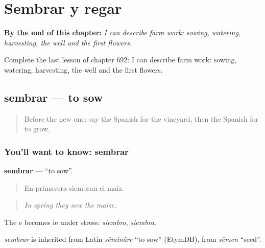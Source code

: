 
\chapter{Sembrar y regar}
\label{ch:es-sembrar-y-regar}

\begin{chapteropening}
\textbf{By the end of this chapter:} \emph{I can describe farm work: sowing, watering, harvesting, the well and the first flowers.}

Complete the last lesson of chapter 692: I can describe farm work: sowing, watering, harvesting, the well and the first flowers.
\end{chapteropening}

\section[sembrar]{sembrar — to sow}

\label{lesson:ES-C692-sembrar}



\begin{quote}
Before the new one: say the Spanish for the vineyard, then the Spanish for to grow.
\end{quote}

\subsection*{You'll want to know: sembrar}
\textbf{sembrar} — \textquotedblleft{}to sow\textquotedblright{}.

\begin{quote}
En primavera siembran el maíz.
\end{quote}

\begin{quote}
\emph{In spring they sow the maize.}
\end{quote}

The e becomes ie under stress: \emph{siembro}, \emph{siembra}.

\begin{cousinweb}
\emph{sembrar} is inherited from Latin \emph{sēmināre} \textquotedblleft{}to sow\textquotedblright{} (EtymDB), from \emph{sēmen} \textquotedblleft{}seed\textquotedblright{}.
\end{cousinweb}

